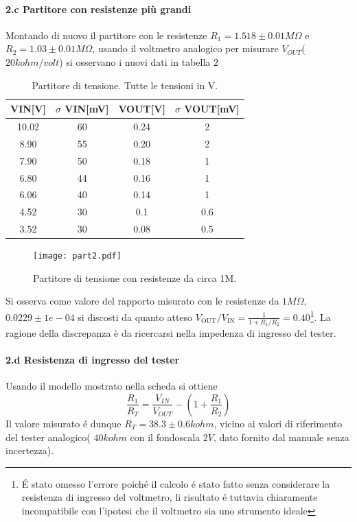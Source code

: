 \documentclass[10pt,a4paper]{article}
\begin{document}
\paragraph{2.c Partitore con resistenze più grandi}
Montando di nuovo il partitore con le resistenze $R_1 = 1.518\pm 0.01 M\Omega$ e $R_2 = 1.03\pm 0.01 M\Omega$, usando il voltmetro analogico per misurare $V_{OUT}$($20 kohm/volt$) si osservano i nuovi dati in tabella 2
\begin{table}[h]
\centering
\begin{tabular}{|c|c|c|c|}
\hline 
VIN[V]& $\sigma$ VIN[mV] & VOUT[V]	 & $\sigma$ VOUT[mV] \\
\hline 
10.02 & 60 & 0.24 & 2 \\
8.90 & 55 & 0.20 & 2 \\
7.90 & 50 & 0.18 & 1 \\
6.80 & 44 & 0.16 & 1 \\
6.06 & 40 & 0.14 & 1 \\
4.52 & 30 & 0.1 & 0.6 \\
3.52 & 30 & 0.08 & 0.5 \\
\hline 
\end{tabular} 
\caption{Partitore di tensione. Tutte le tensioni in V.\label{t:par2}}
\end{table}
\begin{figure}
\centering
\texttt{[image: part2.pdf]}
\caption{Partitore di tensione con resistenze da circa 1M.\label{f:par2}}
\end{figure}

Si osserva come valore del rapporto misurato con le resistenze da $1 M\Omega$, $0.0229 \pm 1e-04$ si discosti da quanto atteso   $V_\mathrm{OUT}/V_\mathrm{IN} = \frac{1}{1+R_1/R_2}= 0.40 $\footnote{\'E stato omesso l'errore poich\'e il calcolo \'e stato fatto senza considerare la resistenza di ingresso del voltmetro, li risultato \'e tuttavia chiaramente incompatibile con l'ipotesi che il voltmetro sia uno strumento ideale}. La ragione della discrepanza \`e da ricercarsi nella impedenza di ingresso del tester.


\paragraph{2.d Resistenza di ingresso del tester}

 Usando il modello mostrato nella scheda si ottiene
\[ \frac{R_1}{R_T} =  \frac{V_{IN}}{V_{OUT}} - (1 +  \frac{R_1}{R_2} )
\]
Il valore misurato \'e dunque $R_T=38.3 \pm 0.6 kohm$, vicino ai valori di riferimento del tester analogico( $40 kohm$ con il fondoscala $2 V$, dato fornito dal manuale senza incertezza).
\end{document}
